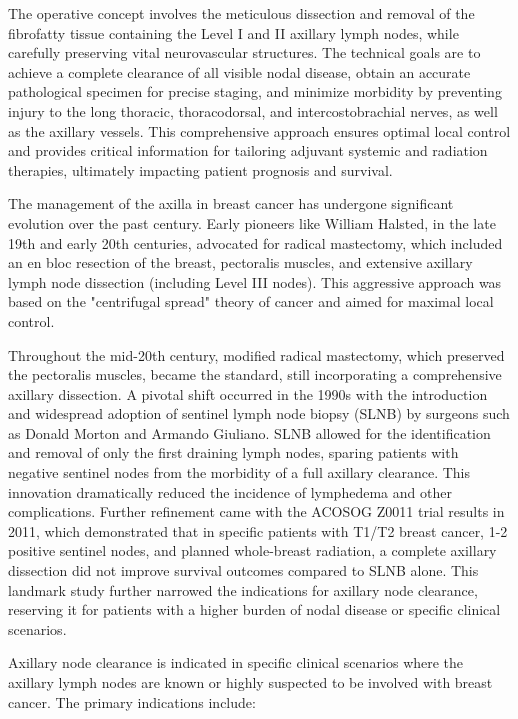 The operative concept involves the meticulous dissection and removal of the fibrofatty tissue containing the Level I and II axillary lymph nodes, while carefully preserving vital neurovascular structures. The technical goals are to achieve a complete clearance of all visible nodal disease, obtain an accurate pathological specimen for precise staging, and minimize morbidity by preventing injury to the long thoracic, thoracodorsal, and intercostobrachial nerves, as well as the axillary vessels. This comprehensive approach ensures optimal local control and provides critical information for tailoring adjuvant systemic and radiation therapies, ultimately impacting patient prognosis and survival.

The management of the axilla in breast cancer has undergone significant evolution over the past century. Early pioneers like William Halsted, in the late 19th and early 20th centuries, advocated for radical mastectomy, which included an en bloc resection of the breast, pectoralis muscles, and extensive axillary lymph node dissection (including Level III nodes). This aggressive approach was based on the "centrifugal spread" theory of cancer and aimed for maximal local control.

Throughout the mid-20th century, modified radical mastectomy, which preserved the pectoralis muscles, became the standard, still incorporating a comprehensive axillary dissection. A pivotal shift occurred in the 1990s with the introduction and widespread adoption of sentinel lymph node biopsy (SLNB) by surgeons such as Donald Morton and Armando Giuliano. SLNB allowed for the identification and removal of only the first draining lymph nodes, sparing patients with negative sentinel nodes from the morbidity of a full axillary clearance. This innovation dramatically reduced the incidence of lymphedema and other complications. Further refinement came with the ACOSOG Z0011 trial results in 2011, which demonstrated that in specific patients with T1/T2 breast cancer, 1-2 positive sentinel nodes, and planned whole-breast radiation, a complete axillary dissection did not improve survival outcomes compared to SLNB alone. This landmark study further narrowed the indications for axillary node clearance, reserving it for patients with a higher burden of nodal disease or specific clinical scenarios.

Axillary node clearance is indicated in specific clinical scenarios where the axillary lymph nodes are known or highly suspected to be involved with breast cancer. The primary indications include:

